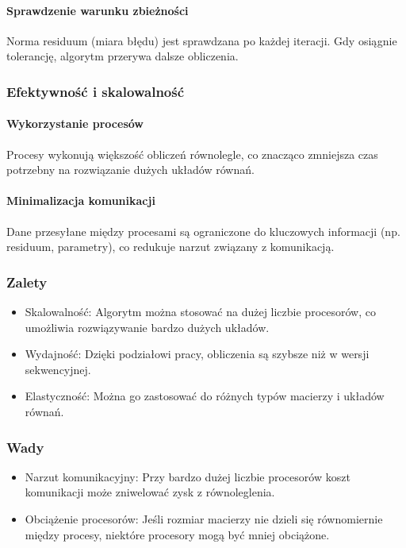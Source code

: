 \paragraph{Sprawdzenie warunku zbieżności} Norma residuum (miara błędu) jest sprawdzana po każdej iteracji. Gdy osiągnie tolerancję, algorytm przerywa dalsze obliczenia.


\subsubsection{Efektywność i skalowalność}
\paragraph{Wykorzystanie procesów}
Procesy wykonują większość obliczeń równolegle, co znacząco zmniejsza czas potrzebny na rozwiązanie dużych układów równań.

\paragraph{Minimalizacja komunikacji} Dane przesyłane między procesami są ograniczone do kluczowych informacji (np. residuum, parametry), co redukuje narzut związany z komunikacją.


\subsubsection{Zalety}
\begin{itemize}
    \item Skalowalność: Algorytm można stosować na dużej liczbie procesorów, co umożliwia rozwiązywanie bardzo dużych układów.
    \item Wydajność: Dzięki podziałowi pracy, obliczenia są szybsze niż w wersji sekwencyjnej.
    \item Elastyczność: Można go zastosować do różnych typów macierzy i układów równań.
\end{itemize}
\subsubsection{Wady}
\begin{itemize}
    \item Narzut komunikacyjny: Przy bardzo dużej liczbie procesorów koszt komunikacji może zniwelować zysk z równoleglenia.
    \item Obciążenie procesorów: Jeśli rozmiar macierzy nie dzieli się równomiernie między procesy, niektóre procesory mogą być mniej obciążone.
\end{itemize}


